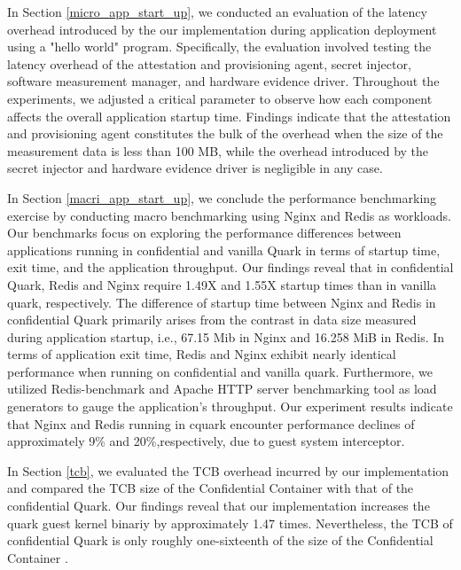 In Section \ref{micro_app_start_up}, we conducted an evaluation of the latency overhead introduced by the our implementation during application deployment using a "hello world" program.  Specifically, the evaluation involved testing the latency overhead of the attestation and provisioning agent, 
secret injector, software measurement manager, and hardware evidence driver. Throughout the experiments, we adjusted a critical parameter to observe how each component affects the overall application startup time. Findings indicate that the attestation and provisioning agent constitutes 
the bulk of the overhead when the size of the measurement data is less than 100 MB, while the overhead introduced by the secret injector and hardware evidence driver is negligible in any case. 

In Section \ref{macri_app_start_up}, we conclude the performance benchmarking exercise by conducting macro benchmarking using Nginx \cite*{nginx} and Redis \cite*{redis} as workloads. Our benchmarks focus on exploring the performance differences between applications running in confidential and vanilla Quark 
in terms of startup time, exit time, and the application throughput. Our findings reveal that in confidential Quark, Redis \cite*{redis} and Nginx \cite*{nginx} require 1.49X and 1.55X startup times than in vanilla quark, respectively. The difference of startup time between Nginx and Redis in 
confidential Quark primarily arises from the contrast in data size measured during application startup, i.e., 67.15 Mib in Nginx and 16.258 MiB in Redis. In terms of application exit time, Redis and Nginx exhibit nearly identical performance when running on confidential  and vanilla quark. 
Furthermore, we utilized Redis-benchmark \cite*{Redis_benchmark} and Apache HTTP server benchmarking tool \cite*{ab} as load generators to gauge the application's throughput. Our experiment results indicate that Nginx and Redis running in cquark encounter performance declines of approximately 
9\% and 20\%,respectively, due to guest system interceptor.

In Section \ref{tcb}, we evaluated the TCB overhead incurred by our implementation and compared the TCB size of the Confidential Container \cite*{confidential_kata} with that of the confidential Quark. Our findings reveal that our implementation increases the quark guest kernel binariy by approximately 1.47 times. Nevertheless, 
the TCB of confidential Quark is only roughly one-sixteenth of the size of the  Confidential Container \cite*{confidential_kata}.

